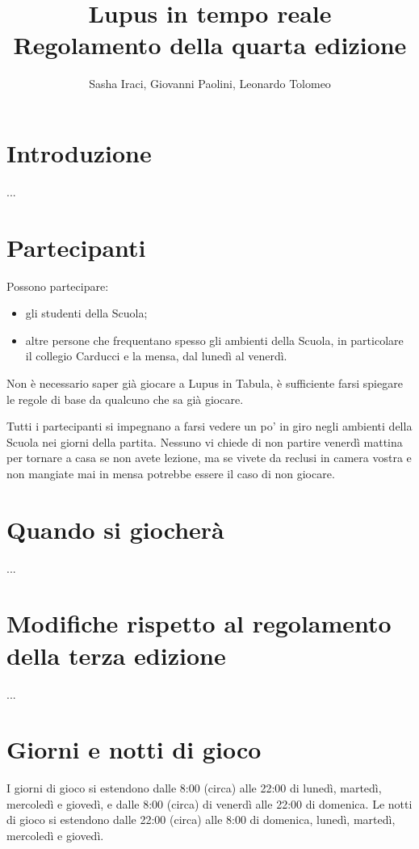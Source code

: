 \documentclass[a4paper,10pt]{article}
\title{Lupus in tempo reale\\ Regolamento della quarta edizione}
\author{Sasha Iraci, Giovanni Paolini, Leonardo Tolomeo}
\begin{document}
\maketitle


\section{Introduzione}

...

\section{Partecipanti}

Possono partecipare:
\begin{itemize}
 \item gli studenti della Scuola;
 \item altre persone che frequentano spesso gli ambienti della Scuola, in particolare il collegio Carducci e la mensa, dal lunedì al venerdì.
\end{itemize}

Non è necessario saper già giocare a Lupus in Tabula, è sufficiente farsi spiegare le regole di base da qualcuno che sa già giocare.

Tutti i partecipanti si impegnano a farsi vedere un po' in giro negli ambienti della Scuola nei giorni della partita. Nessuno vi chiede di non partire venerdì mattina per tornare a casa se non avete lezione, ma se vivete da reclusi in camera vostra e non mangiate mai in mensa potrebbe essere il caso di non giocare.


\section{Quando si giocherà}

...


\section{Modifiche rispetto al regolamento della terza edizione}

...


\section{Giorni e notti di gioco}

I giorni di gioco si estendono dalle 8:00 (circa) alle 22:00 di lunedì, martedì, mercoledì e giovedì, e dalle 8:00 (circa) di venerdì alle 22:00 di domenica.
Le notti di gioco si estendono dalle 22:00 (circa) alle 8:00 di domenica, lunedì, martedì, mercoledì e giovedì.
\end{document}
